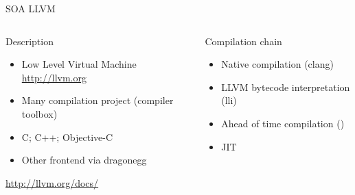 %
\begin{Frame}{SOA LLVM}
  \begin{columns}[t]
    \begin{column}{5cm} %
      \begin{block}{Description}
        \begin{itemize}
        \item Low Level Virtual Machine \url{http://llvm.org}
        \item Many compilation project (compiler toolbox)
        \item C; C++; Objective-C
        \item Other frontend via dragonegg
        \end{itemize}
\href{http://llvm.org/docs/}{http://llvm.org/docs/}
      \end{block} 
    \end{column}
    
    \begin{column}{5cm} %
      \begin{block}{Compilation chain}
        \begin{itemize}
        \item Native compilation (clang)
        \item LLVM bytecode interpretation (lli)
        \item Ahead of time compilation ()
        \item JIT
        \end{itemize}
      \end{block}   
    \end{column}
  \end{columns}  
\end{Frame}


